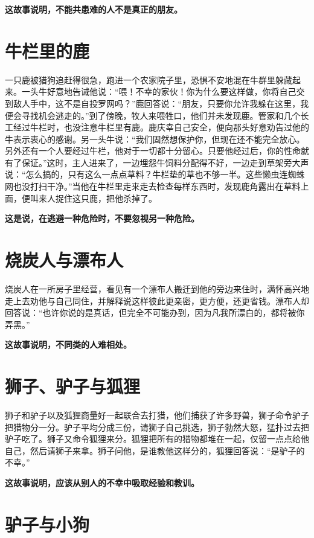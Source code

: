 {\bfseries \color{red}这故事说明，不能共患难的人不是真正的朋友。}

\section{牛栏里的鹿}

一只鹿被猎狗追赶得很急，跑进一个农家院子里，恐惧不安地混在牛群里躲藏起来。一头牛好意地告诫他说：“喂！不幸的家伙！你为什么要这样做，你将自己交到敌人手中，这不是自投罗网吗？”鹿回答说：“朋友，只要你允许我躲在这里，我便会寻找机会逃走的。”到了傍晚，牧人来喂牲口，他们并未发现鹿。管家和几个长工经过牛栏时，也没注意牛栏里有鹿。鹿庆幸自己安全，便向那头好意劝告过他的牛表示衷心的感谢。另一头牛说：“我们固然想保护你，但现在还不能完全放心。另外还有一个人要经过牛栏，他对于一切都十分留心。只要他经过后，你的性命就有了保证。”这时，主人进来了，一边埋怨牛饲料分配得不好，一边走到草架旁大声说：“怎么搞的，只有这么一点点草料？牛栏垫的草也不够一半。这些懒虫连蜘蛛网也没打扫干净。”当他在牛栏里走来走去检查每样东西时，发现鹿角露出在草料上面，便叫来人捉住这只鹿，把他杀掉了。

{\bfseries \color{red}这是说，在逃避一种危险时，不要忽视另一种危险。}

\section{烧炭人与漂布人}

烧炭人在一所房子里经营，看见有一个漂布人搬迁到他的旁边来住时，满怀高兴地走上去劝他与自己同住，并解释说这样彼此更亲密，更方便，还更省钱。漂布人却回答说：“也许你说的是真话，但完全不可能办到，因为凡我所漂白的，都将被你弄黑。”

{\bfseries \color{red}这故事说明，不同类的人难相处。}

\section{狮子、驴子与狐狸}

狮子和驴子以及狐狸商量好一起联合去打猎，他们捕获了许多野兽，狮子命令驴子把猎物分一分。驴子平均分成三份，请狮子自己挑选，狮子勃然大怒，猛扑过去把驴子吃了。狮子又命令狐狸来分。狐狸把所有的猎物都堆在一起，仅留一点点给他自己，然后请狮子来拿。狮子问他，是谁教他这样分的，狐狸回答说：“是驴子的不幸。”

{\bfseries \color{red}这故事说明，应该从别人的不幸中吸取经验和教训。}

\section{驴子与小狗}

